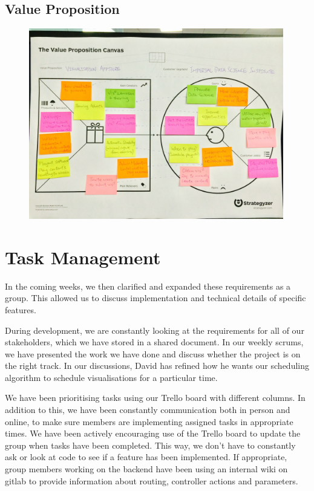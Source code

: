 \documentclass[a4paper]{article}
\begin{document}
\subsection{Value Proposition}
\begin{figure}[H]
   \begin{center}
      \includegraphics[width = 0.99\textwidth, trim = 1cm 6.5cm 1cm 4.5cm, clip]{./evaluation/value_prop_canvas.jpg}

   \end{center}
\end{figure}



\section{Task Management}
In the coming weeks, we then clarified and expanded these requirements as 
a group. This allowed us to discuss implementation and technical details
of specific features.


During development, we are constantly looking at the requirements for all of our stakeholders, which 
we have stored in a shared document. In our weekly scrums, we have 
presented the work we have done and discuss whether the project is on the 
right track. In our discussions, David has refined how he wants our
scheduling algorithm to schedule visualisations for a particular time. 



We have been prioritising tasks using our Trello board with different
columns. In addition to this, we have been constantly communication both 
in person and online, to make sure members are implementing assigned tasks
in appropriate times. We have been actively encouraging use of the Trello 
board to update the group when tasks have been completed. This way, 
we don't have to constantly ask or look at code to see if a feature has 
been implemented. If appropriate, group members working on the backend
have been using an internal wiki on gitlab to provide information about
routing, controller actions and parameters. 
\end{document}
